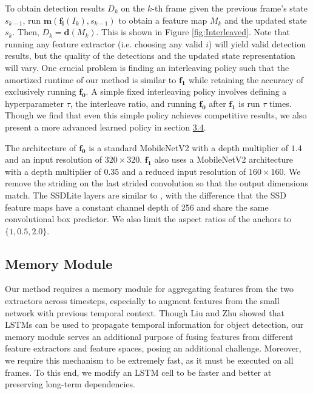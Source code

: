 \documentclass[10pt,twocolumn,letterpaper]{article}
\begin{document}
To obtain detection results $D_k$ on the $k$-th frame given the previous frame's state $s_{k-1}$, run $\mathbf{m}(\mathbf{f_i}(I_k), s_{k-1})$ to obtain a feature map $M_k$ and the updated state $s_k$. Then, $D_k = \mathbf{d}(M_k)$. This is shown in Figure \ref{fig:Interleaved}. Note that running any feature extractor (i.e. choosing any valid $i$) will yield valid detection results, but the quality of the detections and the updated state representation will vary. One crucial problem is finding an interleaving policy such that the amortized runtime of our method is similar to $\mathbf{f_1}$ while retaining the accuracy of exclusively running $\mathbf{f_0}$. A simple fixed interleaving policy involves defining a hyperparameter $\tau$, the interleave ratio, and running $\mathbf{f_0}$ after $\mathbf{f_1}$ is run $\tau$ times. Though we find that even this simple policy achieves competitive results, we also present a more advanced learned policy in section \hyperref[sec:3.4]{3.4}.

The architecture of $\mathbf{f_0}$ is a standard MobileNetV2 \cite{sandler2018mobilenetv2} with a depth multiplier of $1.4$ and an input resolution of $320 \times 320$. $\mathbf{f_1}$ also uses a MobileNetV2 architecture with a depth multiplier of $0.35$ and a reduced input resolution of $160\times 160$. We remove the striding on the last strided convolution so that the output dimensions match. The SSDLite layers are similar to \cite{sandler2018mobilenetv2}, with the difference that the SSD feature maps have a constant channel depth of 256 and share the same convolutional box predictor. We also limit the aspect ratios of the anchors to $\{1, 0.5, 2.0\}$.


\subsection{Memory Module}\label{sec:3.2}
Our method requires a memory module for aggregating features from the two extractors across timesteps, especially to augment features from the small network with previous temporal context. Though Liu and Zhu \cite{liu2018mobile} showed that LSTMs can be used to propagate temporal information for object detection, our memory module serves an additional purpose of fusing features from different feature extractors and feature spaces, posing an additional challenge. Moreover, we require this mechanism to be extremely fast, as it must be executed on all frames. To this end, we modify an LSTM cell to be faster and better at preserving long-term dependencies.
\end{document}
